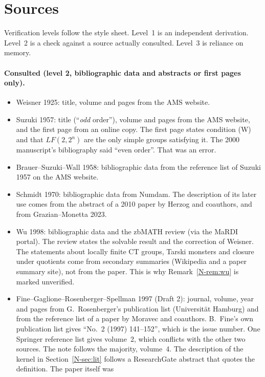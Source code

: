 \documentclass[12pt,letterpaper]{article}
\begin{document}
\section{Sources}\label{sec:sources}

Verification levels follow the style sheet. Level~1 is an independent
derivation. Level~2 is a check against a source actually consulted. Level~3
is reliance on memory.

\paragraph{Consulted (level 2, bibliographic data and abstracts or first
pages only).}
\begin{itemize}[itemsep=1pt]
\item Weisner 1925: title, volume and pages from the AMS website.
\item Suzuki 1957: title (``\emph{odd} order''), volume and pages from the
  AMS website, and the first page from an online copy. The first page states
  condition (W) and that $LF(2,2^n)$ are the only simple groups satisfying
  it. The 2000 manuscript's bibliography said ``even order''. That was an
  error.
\item Brauer--Suzuki--Wall 1958: bibliographic data from the reference list
  of Suzuki 1957 on the AMS website.
\item Schmidt 1970: bibliographic data from Numdam. The description of its
  later use comes from the abstract of a 2010 paper by Herzog and coauthors,
  and from Grazian--Monetta 2023.
\item Wu 1998: bibliographic data and the zbMATH review (via the MaRDI
  portal). The review states the solvable result and the correction of
  Weisner. The statements about locally finite CT groups, Tarski monsters and
  closure under quotients come from secondary summaries (Wikipedia and a
  paper summary site), not from the paper. This is why
  Remark~\ref{N-rem:wu} is marked unverified.
\item Fine--Gaglione--Rosenberger--Spellman 1997 (Draft 2): journal, volume,
  year and pages from G.~Rosenberger's publication list (Universit\"at
  Hamburg) and from the reference list of a paper by Moravec and coauthors.
  B.~Fine's own publication list gives ``No.~2 (1997) 141--152'', which is
  the issue number. One Springer reference list gives volume~2, which
  conflicts with the other two sources. The note follows the majority,
  volume~4. The description of the kernel in Section~\ref{N-sec:lit} follows
  a ResearchGate abstract that quotes the definition. The paper itself was

\end{itemize}
\end{document}
